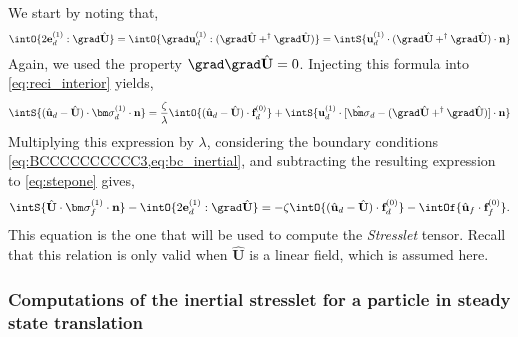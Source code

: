We start by noting that, 
\begin{equation}
    \intO{ 2\textbf{e}_d^{(1)} : \grad \hat{\textbf{U}} }
    =\intO{ \grad \textbf{u}_d^{(1)} : (\grad \hat{\textbf{U}} +^\dagger \grad \hat{\textbf{U}}) }
    =
    \intS{  \textbf{u}_d^{(1)} \cdot (\grad \hat{\textbf{U}} + ^\dagger\grad \hat{\textbf{U}})  \cdot \textbf{n}}
\end{equation}
Again, we used the property $\grad\grad \hat{\textbf{U}} = 0$. 
Injecting this formula into \ref{eq:reci_interior} yields,
\begin{equation*}
    \intS{ (\hat{\textbf{u}}_d - \hat{\textbf{U}})\cdot \bm\sigma_d^{(1)} \cdot \textbf{n}}
    =
    \frac{\zeta}{\lambda} \intO{(\hat{\textbf{u}}_d - \hat{\textbf{U}}) \cdot \textbf{f}_d^{(0)}}
    + \intS{
         \textbf{u}_d^{(1)}\cdot[\hat{\bm\sigma}_d  - (\grad \hat{\textbf{U}} + ^\dagger\grad \hat{\textbf{U}})]\cdot \textbf{n}
    }
\end{equation*}
Multiplying this expression by $\lambda$, considering the boundary conditions \ref{eq:BCCCCCCCCCC3,eq:bc_inertial}, and subtracting the resulting expression to \ref{eq:stepone} gives,
\begin{equation}
    \intS{\hat{\textbf{U}}\cdot  \bm\sigma_f^{(1)} \cdot \textbf{n}}
    - \intO{
        2\textbf{e}_d^{(1)}:\grad \hat{\textbf{U}} 
   }
    = 
    - \zeta \intO{(\hat{\textbf{u}}_d - \hat{\textbf{U}}) \cdot \textbf{f}_d^{(0)}}
    - \intOf{\hat{\textbf{u}}_f\cdot  \textbf{f}^{(0)}_f}. 
    \label{eq:reciprocal_f2_one}
\end{equation}
This equation is the one that will be used to compute the \textit{Stresslet} tensor. 
Recall that this relation is only valid when  $\hat{\textbf{U}}$ is a linear field, which is assumed here. 

\subsubsection{Computations of the inertial stresslet for a particle in steady state translation}

